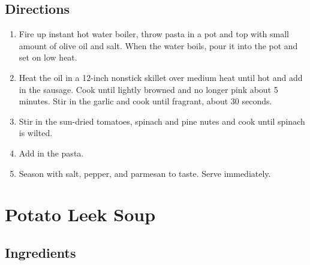\documentclass[ansiapaper,10pt,english]{sphinxmanual}
\begin{document}
\section{Directions}
\label{\detokenize{Pine_Nut_Pasta:directions}}\begin{enumerate}
\item {} 
Fire up instant hot water boiler, throw pasta in a pot and top with small amount of olive oil and salt.  When the water boils, pour it into the pot and set on low heat.

\item {} 
Heat the oil in a 12-inch nonstick skillet over medium heat until hot and add in the sausage. Cook until lightly browned and no longer pink about 5 minutes. Stir in the garlic and cook until fragrant, about 30 seconds.

\item {} 
Stir in the sun-dried tomatoes, spinach and pine nutes and cook until spinach is wilted.

\item {} 
Add in the pasta.

\item {} 
Season with salt, pepper, and parmesan to taste.  Serve immediately.

\end{enumerate}


\chapter{Potato Leek Soup}
\label{\detokenize{Potato_Leek_Soup:potato-leek-soup}}\label{\detokenize{Potato_Leek_Soup::doc}}

\section{Ingredients}
\label{\detokenize{Potato_Leek_Soup:ingredients}}
%
\begin{sphinxVerbatim}[commandchars=\\\{\}]
  

            

        

   

   

    

     

    
\end{sphinxVerbatim}
\end{document}
